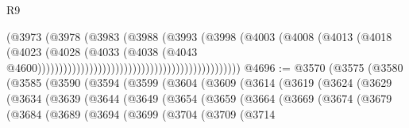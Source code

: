 \begin{lexlean}{R9}
\begin{coremodule}
                                                                    (@3973
                                                                      (@3978
                                                                        (@3983
                                                                          (@3988
                                                                            (@3993
                                                                              (@3998
                                                                                (@4003
                                                                                  (@4008
                                                                                    (@4013
                                                                                      (@4018
                                                                                        (@4023
                                                                                          (@4028
                                                                                            (@4033
                                                                                              (@4038
                                                                                                (@4043
                                                                                                  @4600)))))))))))))))))))))))))))))))))))))))))))))))
@4696 := @3570
    (@3575
      (@3580
        (@3585
          (@3590
            (@3594
              (@3599
                (@3604
                  (@3609
                    (@3614
                      (@3619
                        (@3624
                          (@3629
                            (@3634
                              (@3639
                                (@3644
                                  (@3649
                                    (@3654
                                      (@3659
                                        (@3664
                                          (@3669
                                            (@3674
                                              (@3679
                                                (@3684
                                                  (@3689
                                                    (@3694
                                                      (@3699
                                                        (@3704
                                                          (@3709
                                                            (@3714

\end{coremodule}
\end{lexlean}
